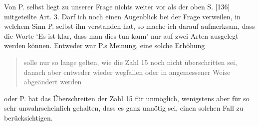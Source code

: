 Von P. selbst liegt zu unserer Frage nichts weiter vor als der oben S. [136] mitgeteilte Art. 3. Darf ich noch einen Augenblick bei der Frage verweilen, in welchem Sinn P. selbst ihn verstanden hat, so mache ich darauf aufmerksam, dass die Worte ‘Es ist klar, dass man dies tun kann’ nur auf zwei Arten ausgelegt werden können. Entweder war P.s Meinung, eine solche Erhöhung
\begin{quote}
solle nur so lange gelten, wie die Zahl 15 noch nicht überschritten sei, danach aber entweder wieder wegfallen oder in angemessener Weise abgeändert werden
\end{quote}
\noindent oder P. hat das Überschreiten der Zahl 15 für unmöglich, wenigstens aber für so sehr unwahrscheinlich gehalten, dass es ganz unnötig sei, einen solchen Fall zu berücksichtigen.
